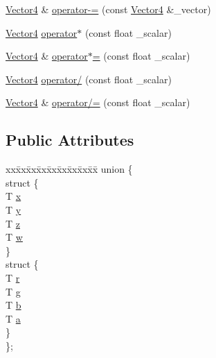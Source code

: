 \begin{DoxyCompactItemize}
\item 
\mbox{\hyperlink{structpad_1_1math_1_1_vector4}{Vector4}} \& \mbox{\hyperlink{structpad_1_1math_1_1_vector4_ae27aa6827d54b1b0033ee99e79d19660}{operator-\/=}} (const \mbox{\hyperlink{structpad_1_1math_1_1_vector4}{Vector4}} \&\+\_\+vector)
\item 
\mbox{\hyperlink{structpad_1_1math_1_1_vector4}{Vector4}} \mbox{\hyperlink{structpad_1_1math_1_1_vector4_a57e32bb850ebd1b9ac4a6adf36ebfbe4}{operator$\ast$}} (const float \+\_\+scalar)
\item 
\mbox{\hyperlink{structpad_1_1math_1_1_vector4}{Vector4}} \& \mbox{\hyperlink{structpad_1_1math_1_1_vector4_a33fee52eb7633acd92f85449d261b820}{operator$\ast$=}} (const float \+\_\+scalar)
\item 
\mbox{\hyperlink{structpad_1_1math_1_1_vector4}{Vector4}} \mbox{\hyperlink{structpad_1_1math_1_1_vector4_ad818def83cbc4255b79ec185450633ca}{operator/}} (const float \+\_\+scalar)
\item 
\mbox{\hyperlink{structpad_1_1math_1_1_vector4}{Vector4}} \& \mbox{\hyperlink{structpad_1_1math_1_1_vector4_a3703b229047d4cd251215a409c8ad7a5}{operator/=}} (const float \+\_\+scalar)
\end{DoxyCompactItemize}
\subsection*{Public Attributes}
\begin{DoxyCompactItemize}
\item 
\begin{tabbing}
xx\=xx\=xx\=xx\=xx\=xx\=xx\=xx\=xx\=\kill
union \{\\
\>struct \{\\
\>\>T \mbox{\hyperlink{structpad_1_1math_1_1_vector4_a977619c0dbd2e7060bb1f839d3fa8337}{x}}\\
\>\>T \mbox{\hyperlink{structpad_1_1math_1_1_vector4_a2461711530968b1c7c5ff1256a5a6098}{y}}\\
\>\>T \mbox{\hyperlink{structpad_1_1math_1_1_vector4_a9407faaccb5b094aeb3cadc36e71755e}{z}}\\
\>\>T \mbox{\hyperlink{structpad_1_1math_1_1_vector4_abbbd617d5083a886936724282216bee4}{w}}\\
\>\} \\
\>struct \{\\
\>\>T \mbox{\hyperlink{structpad_1_1math_1_1_vector4_a2288e82eaf6dd6c283f4714503b13096}{r}}\\
\>\>T \mbox{\hyperlink{structpad_1_1math_1_1_vector4_ac4a05c791e0522930bed20045239e870}{g}}\\
\>\>T \mbox{\hyperlink{structpad_1_1math_1_1_vector4_a00d2630fa1befcfa4c343e2f4187ec71}{b}}\\
\>\>T \mbox{\hyperlink{structpad_1_1math_1_1_vector4_afb5d50917f750bbe417871b7f290b10c}{a}}\\
\>\} \\
\}; \\

\end{tabbing}\end{DoxyCompactItemize}



